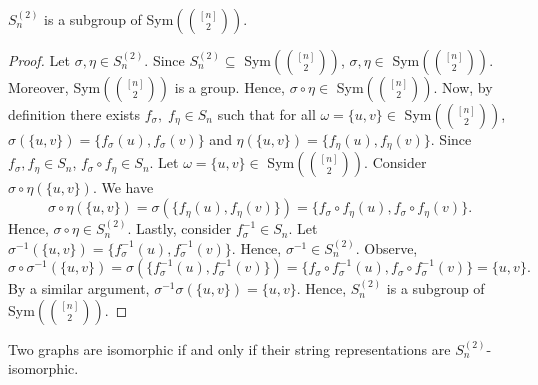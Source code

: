 \begin{lemma}
$S_n^{(2)}$ is a subgroup of Sym$({[n]\choose 2})$. 
\end{lemma}
\begin{proof}
Let $\sigma,\eta\in S_n^{(2)}$. Since $S_n^{(2)}\subseteq$ Sym$\left({[n]\choose 2}\right)$, $\sigma,\eta\in$ Sym$\left({[n]\choose 2}\right)$. Moreover, Sym$\left({[n]\choose 2}\right)$ is a group. Hence, $\sigma\circ\eta\in$ Sym$\left({[n]\choose 2}\right)$. Now, by definition there exists $f_\sigma,\;f_\eta\in S_n$ such that for all $\omega=\{u,v\}\in$ Sym$({[n]\choose 2})$, $\sigma(\{u,v\})=\{f_\sigma(u),f_\sigma(v)\}$ and $\eta(\{u,v\})=\{f_\eta(u),f_\eta(v)\}.$ Since $f_\sigma,f_\eta\in S_n$, $f_\sigma\circ f_\eta\in S_n$. Let $\omega=\{u,v\}\in$ Sym$({[n]\choose 2})$. Consider $\sigma\circ\eta(\{u,v\})$. We have
\[\sigma\circ\eta(\{u,v\})=\sigma(\{f_\eta(u),f_\eta(v)\})=\{f_\sigma\circ f_\eta(u),f_\sigma\circ f_\eta(v)\}.\] 
Hence, $\sigma\circ\eta\in S_n^{(2)}$. Lastly, consider $f_\sigma^{-1}\in S_n$. Let $\sigma^{-1}(\{u,v\})=\{f_\sigma^{-1}(u),f_\sigma^{-1}(v)\}$. Hence, $\sigma^{-1}\in S_n^{(2)}$. Observe,
\[\sigma\circ\sigma^{-1}(\{u,v\})=\sigma(\{f_\sigma^{-1}(u),f_\sigma^{-1}(v)\})=\{f_\sigma\circ f_\sigma^{-1}(u),f_\sigma\circ f_\sigma^{-1}(v)\}=\{u,v\}.\] By a similar argument, $\sigma^{-1}\sigma(\{u,v\})=\{u,v\}$. Hence, $S_n^{(2)}$ is a subgroup of Sym$({[n]\choose 2})$.
\end{proof}
\begin{lemma}
Two graphs are isomorphic if and only if their string representations are $S_n^{(2)}$-isomorphic.
\end{lemma}
